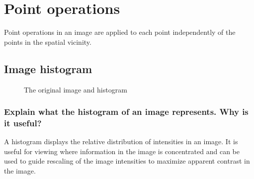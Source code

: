 \documentclass[article, 1.5space, letterpaper, 12pt, oneside, header, footer]{SydeClass}
\begin{document}
\section{Point operations}

Point operations in an image are applied to each point independently of the points in the spatial vicinity.

\subsection{Image histogram}

\begin{figure}[ht]
\centering
	\caption{The original image and histogram}
	\label{fig:hist-original}
\end{figure}

\subsubsection{Explain what the histogram of an image represents. Why is it useful?}

A histogram displays the relative distribution of intensities in an image. It is useful for viewing where information in the image is concentrated and can be used to guide rescaling of the image intensities to maximize apparent contrast in the image.
\end{document}
